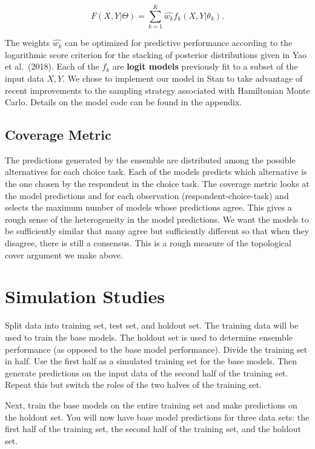\documentclass[12pt,titlepage]{mktg-article}
\begin{document}
\[F(X,Y|\Theta) = \sum_{k=1}^K \hat{w_k} f_k(X, Y|\theta_k).\]

The weights \(\hat{w_k}\) can be optimized for predictive performance according to the logarithmic score criterion for the stacking of posterior distributions given in Yao et al.~(2018). Each of the \(f_k\) are \textbf{logit models} previously fit to a subset of the input data \(X,Y\). We chose to implement our model in Stan to take advantage of recent improvements to the sampling strategy associated with Hamiltonian Monte Carlo. Details on the model code can be found in the appendix.

\hypertarget{coverage-metric}{%
\subsection{Coverage Metric}\label{coverage-metric}}

The predictions generated by the ensemble are distributed among the possible alternatives for each choice task. Each of the models predicts which alternative is the one chosen by the respondent in the choice task. The coverage metric looks at the model predictions and for each observation (respondent-choice-task) and selects the maximum number of models whose predictions agree. This gives a rough sense of the heterogeneity in the model predictions. We want the models to be sufficiently similar that many agree but sufficiently different so that when they disagree, there is still a consensus. This is a rough measure of the topological cover argument we make above.

\hypertarget{simulation-studies}{%
\section{Simulation Studies}\label{simulation-studies}}

Split data into training set, test set, and holdout set. The training data will be used to train the base models. The holdout set is used to determine ensemble performance (as opposed to the base model performance). Divide the training set in half. Use the first half as a simulated training set for the base models. Then generate predictions on the input data of the second half of the training set. Repeat this but switch the roles of the two halves of the training set.

Next, train the base models on the entire training set and make predictions on the holdout set. You will now have base model predictions for three data sets: the first half of the training set, the second half of the training set, and the holdout set.
\end{document}
